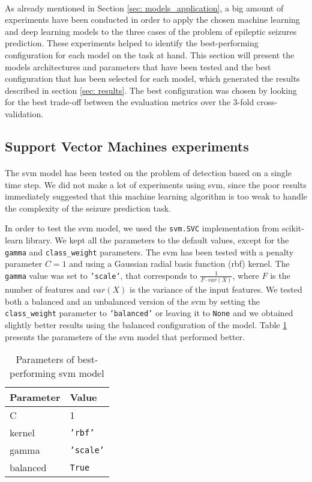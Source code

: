 \paragraph{} As already mentioned in Section \ref{sec: models_application}, a big amount of experiments have been conducted in order to apply the chosen machine learning and deep learning models to the three cases of the problem of epileptic seizures prediction. These experiments helped to identify the best-performing configuration for each model on the task at hand. This section will present the models architectures and parameters that have been tested and the best configuration that has been selected for each model, which generated the results described in section \ref{sec: results}. The best configuration was chosen by looking for the best trade-off between the evaluation metrics over the 3-fold cross-validation.

\subsection{Support Vector Machines experiments}
\paragraph{} The \acs{svm} model has been tested on the problem of detection based on a single time step. We did not make a lot of experiments using \acs{svm}, since the poor results immediately suggested that this machine learning algorithm is too weak to handle the complexity of the seizure prediction task.

In order to test the \acs{svm} model, we used the \texttt{svm.SVC} implementation from scikit-learn library. We kept all the parameters to the default values, except for the \texttt{gamma} and \texttt{class\_weight} parameters. The \acs{svm} has been tested with a penalty parameter $C=1$ and using a Gaussian radial basis function (\acs{rbf}) kernel. The \texttt{gamma} value was set to \texttt{'scale'}, that corresponds to $\frac{1}{F \cdot var(X)}$, where $F$ is the number of features and $var(X)$ is the variance of the input features. We tested both a balanced and an unbalanced version of the \acs{svm} by setting the \texttt{class\_weight} parameter to \texttt{'balanced'} or leaving it to \texttt{None} and we obtained slightly better results using the balanced configuration of the model. Table \ref{tab:svm_param} presents the parameters of the \acs{svm} model that performed better.
\begin{table}[htbp]
    \centering
    \begin{tabular}{ll}
        \hline
        \textbf{Parameter}  & \textbf{Value} \\\hline
        C                   & 1 \\
        kernel              & \texttt{'rbf'} \\
        gamma               & \texttt{'scale'} \\
        balanced            & \texttt{True} \\\hline
    \end{tabular}
    \caption{Parameters of best-performing \acs{svm} model}
    \label{tab:svm_param}
\end{table}

